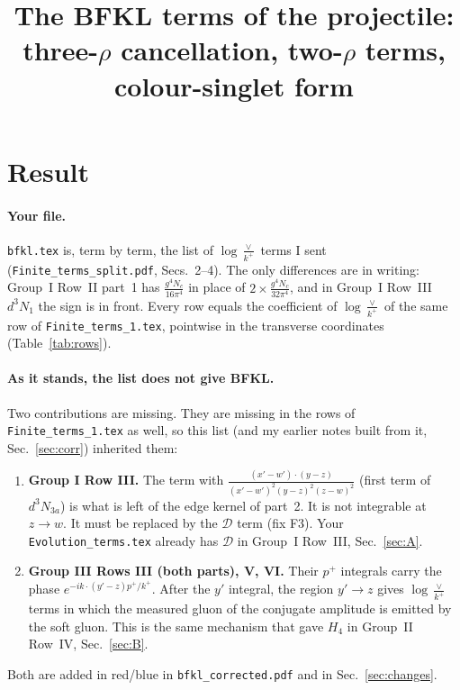 \documentclass[10pt]{article}
\title{The BFKL terms of the projectile:\\[2pt] \large three-$\rho$ cancellation, two-$\rho$ terms, colour-singlet form}
\date{}
\numberwithin{equation}{section}
\begin{document}
\maketitle
\tableofcontents

\section{Result}\label{sec:result}
\paragraph{Your file.} \texttt{bfkl.tex} is, term by term, the list of $\log\frac{\vee}{k^+}$ terms I sent (\texttt{Finite\_terms\_split.pdf}, Secs.~2--4). The only differences are in writing: Group~I Row~II part~1 has $\frac{g^4N_c}{16\pi^4}$ in place of $2\times\frac{g^4N_c}{32\pi^4}$, and in Group~I Row~III $d^3N_1$ the sign is in front. Every row equals the coefficient of $\log\frac{\vee}{k^+}$ of the same row of \texttt{Finite\_terms\_1.tex}, pointwise in the transverse coordinates (Table~\ref{tab:rows}).

\paragraph{As it stands, the list does not give BFKL.} Two contributions are missing. They are missing in the rows of \texttt{Finite\_terms\_1.tex} as well, so this list (and my earlier notes built from it, Sec.~\ref{sec:corr}) inherited them:
\begin{enumerate}
\item[(A)] \textbf{Group I Row III.} The term with $\frac{(x'-w')\cdot(y-z)}{(x'-w')^2(y-z)^2(z-w)^2}$ (first term of $d^3N_{3a}$) is what is left of the edge kernel of part~2. It is not integrable at $z\to w$. It must be replaced by the $\mathcal D$ term (fix F3). Your \texttt{Evolution\_terms.tex} already has $\mathcal D$ in Group~I Row~III, Sec.~\ref{sec:A}.
\item[(B)] \textbf{Group III Rows III (both parts), V, VI.} Their $p^+$ integrals carry the phase $e^{-ik\cdot(y'-z)p^+/k^+}$. After the $y'$ integral, the region $y'\to z$ gives $\log\frac{\vee}{k^+}$ terms in which the measured gluon of the conjugate amplitude is emitted by the soft gluon. This is the same mechanism that gave $H_4$ in Group~II Row~IV, Sec.~\ref{sec:B}.
\end{enumerate}
Both are added in red/blue in \texttt{bfkl\_corrected.pdf} and in Sec.~\ref{sec:changes}.
\end{document}
